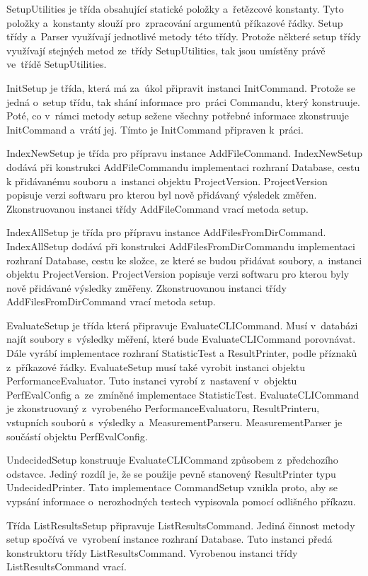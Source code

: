 SetupUtilities je třída obsahující statické položky a~řetězcové konstanty.
Tyto položky a~konstanty slouží pro~zpracování argumentů příkazové řádky.
Setup třídy a~Parser využívají jednotlivé metody této třídy.
Protože některé setup třídy využívají stejných metod ze~třídy SetupUtilities, tak jsou umístěny
právě ve~třídě SetupUtilities.

InitSetup je třída, která má za~úkol připravit instanci InitCommand. Protože se jedná
o~setup třídu, tak shání informace pro~práci Commandu, který konstruuje. Poté, co v~rámci
metody setup sežene všechny potřebné informace zkonstruuje InitCommand a~vrátí jej.
Tímto je InitCommand připraven k~práci.

IndexNewSetup je třída pro přípravu instance AddFileCommand. IndexNewSetup dodává
při konstrukci AddFileCommandu implementaci rozhraní Database, cestu k přidávanému souboru
a~instanci objektu ProjectVersion. ProjectVersion popisuje verzi softwaru pro kterou
byl nově přidávaný výsledek změřen. Zkonstruovanou instanci třídy AddFileCommand vrací metoda setup.

IndexAllSetup je třída pro přípravu instance AddFilesFromDirCommand. IndexAllSetup dodává
při konstrukci AddFilesFromDirCommandu implementaci rozhraní Database, cestu ke složce, ze které se budou přidávat soubory,
a~instanci objektu ProjectVersion. ProjectVersion popisuje verzi softwaru pro kterou
byly nově přidávané výsledky změřeny. Zkonstruovanou instanci třídy AddFilesFromDirCommand vrací metoda setup.

EvaluateSetup je třída která připravuje EvaluateCLICommand. Musí v~databázi najít
soubory s~výsledky měření, které bude EvaluateCLICommand porovnávat. Dále vyrábí
implementace rozhraní StatisticTest a ResultPrinter, podle příznaků z~příkazové řádky.
EvaluateSetup musí také vyrobit instanci objektu PerformanceEvaluator. Tuto instanci vyrobí
z~nastavení v~objektu PerfEvalConfig a~ze~zmíněné implementace StatisticTest. EvaluateCLICommand je zkonstruovaný
z~vyrobeného PerformanceEvaluatoru, ResultPrinteru, vstupních souborů s~výsledky
a~MeasurementParseru. MeasurementParser je součástí objektu PerfEvalConfig.

UndecidedSetup konstruuje EvaluateCLICommand způsobem z~předchozího odstavce.
Jediný rozdíl je, že se použije pevně stanovený ResultPrinter typu UndecidedPrinter.
Tato implementace CommandSetup vznikla proto, aby se vypsání informace o~nerozhodných
testech vypisovala pomocí odlišného příkazu.

Třída ListResultsSetup připravuje ListResultsCommand. Jediná činnost metody setup
spočívá ve~vyrobení instance rozhraní Database. Tuto instanci předá konstruktoru
třídy ListResultsCommand. Vyrobenou instanci třídy ListResultsCommand vrací.

